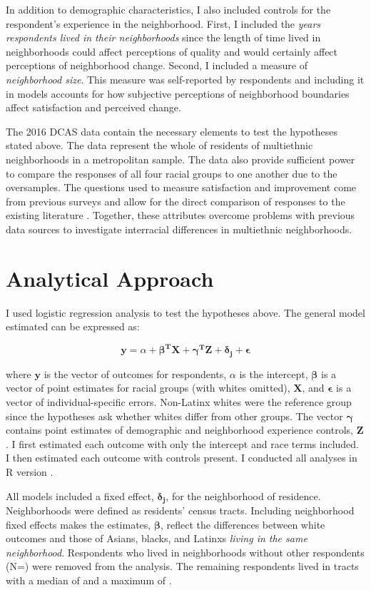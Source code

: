 \documentclass{baderart}
\renewcommand{\needcite}[1][]{%
	\strong{[CITE: %
		\ifthenelse{\equal{#1}{}}{}{: #1}	%
	]}}
\begin{document}
In addition to demographic characteristics, I also included controls for the respondent's experience in the neighborhood. First, I included the \emph{years respondents lived in their neighborhoods} since the length of time lived in neighborhoods could affect perceptions of quality and would certainly affect perceptions of neighborhood change. Second, I included a measure of \emph{neighborhood size}. This measure was self-reported by respondents and including it in models accounts for how subjective perceptions of neighborhood boundaries affect satisfaction and perceived change.

The 2016 DCAS data contain the necessary elements to test the hypotheses stated above. The data represent the whole of residents of multiethnic neighborhoods in a metropolitan sample. The data also provide sufficient power to compare the responses of all four racial groups to one another due to the oversamples. The questions used to measure satisfaction and improvement come from previous surveys and allow for the direct comparison of responses to the existing literature\needcite. Together, these attributes overcome problems with previous data sources to investigate interracial differences in multiethnic neighborhoods.

\section{Analytical Approach}\label{analytical-approach}

I used logistic regression analysis to test the hypotheses above. The general model estimated can be expressed as:

\[\mathbf{y} = \alpha + \mathbf{\beta^T X} + \mathbf{\gamma^T Z} + \mathbf{\delta_j} + \mathbf{\epsilon}\]

\noindent where \(\mathbf{y}\) is the vector of outcomes for respondents, \(\alpha\) is the intercept, \(\mathbf{\beta}\) is a vector of point estimates for racial groups (with whites omitted), \(\mathbf{X}\), and \(\mathbf{\epsilon}\) is a vector of individual-specific errors. Non-Latinx whites were the reference group since the hypotheses ask whether whites differ from other groups. The vector \(\mathbf{\gamma}\) contains point estimates of demographic and neighborhood experience controls, \(\mathbf{Z}\). I first estimated each outcome with only the intercept and race terms included. I then estimated each outcome with controls present. I conducted all analyses in R version \Rversion.

All models included a fixed effect, \(\mathbf{\delta_j}\), for the neighborhood of residence. Neighborhoods were defined as residents' census tracts. Including neighborhood fixed effects makes the estimates, \(\mathbf{\beta}\), reflect the differences between white outcomes and those of Asians, blacks, and Latinxs \emph{living in the same neighborhood}. Respondents who lived in neighborhoods without other respondents (N=\oneresp) were removed from the analysis. The remaining respondents lived in tracts with a median of \medNpertract and a maximum of \maxNpertract.
\end{document}
